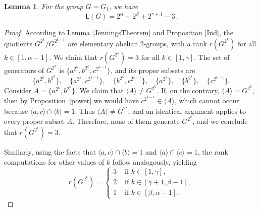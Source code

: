 \documentclass[a4paper,11pt]{article}
\numberwithin{equation}{section}
\newtheorem{lem}[thm]{Lemma}
\newcommand{\no}{\noindent}
\begin{document}
\begin{lem}\label{LemmaG_1} For the group $G=G_1$, we have
$$\mathsf{L}(G)= 2^\alpha +2^\beta +2^{\gamma+1}-3.$$
    
\end{lem}
\begin{proof} According to Lemma \ref{JenningsTheorem} and Proposition \ref{Ind}, the quotients  $G^{2^k}/G^{2^{k+1}}$ are elementary abelian $2$-groups, with a rank $r(G^{2^k})$ for all $k \in [1,\alpha-1]$. We claim that $r(G^{2^k}) = 3$ for all $k \in [1,\gamma]$.  
The set of generators of $G^{2^k}$ is $\{a^{2^k}, b^{2^k}, c^{2^{k-1}}\}$, and its proper subsets are
\[
\{a^{2^k}, b^{2^k}\},\quad 
\{a^{2^k}, c^{2^{k-1}}\},\quad
\{b^{2^k}, c^{2^{k-1}}\},\quad
\{a^{2^k}\},\quad
\{b^{2^k}\},\quad
\{c^{2^{k-1}}\}.
\]
Consider $A = \{a^{2^k}, b^{2^k}\}$. We claim that $\langle A \rangle \neq G^{2^k}$.  
If, on the contrary, $\langle A \rangle = G^{2^k}$, then by Proposition~\ref{power} we would have  
$c^{2^{k-1}} \in \langle A \rangle$, which cannot occur because  
$\langle a, c \rangle \cap \langle b \rangle = 1$.  
Thus $\langle A \rangle \neq G^{2^k}$, and an identical argument applies to every proper subset $A$.  
Therefore, none of them generate $G^{2^k}$, and we conclude that $r(G^{2^k}) = 3$.



\no Similarly, using the facts that $\langle a,c \rangle \cap \langle b \rangle = 1$ and $\langle a \rangle \cap \langle c \rangle = 1$, the rank computations for other values of $k$ follow analogously, yielding
 \begin{equation*}
     r(G^{2^k})=
     \begin{cases}
         3 & \text{ if } k \in [1, \gamma], \\ 
         2 & \text{ if } k \in [\gamma+1, \beta-1], \\
         1 & \text{ if } k \in [\beta, \alpha-1].
     \end{cases}
 \end{equation*}
 

\end{proof}
\end{document}
